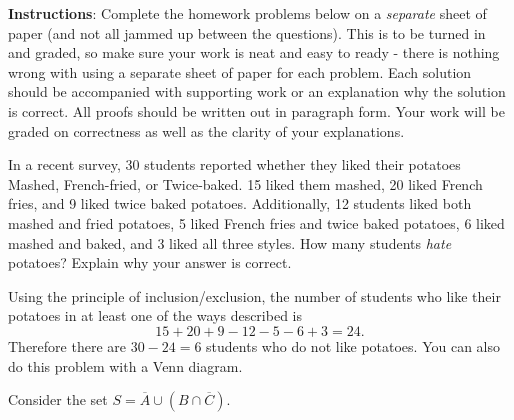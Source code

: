 \documentclass[11pt]{exam}
\def\circleA{(-.5,0) circle (1)}
\def\circleAlabel{(-1.5,.6) node[above]{$A$}}
\def\circleB{(.5,0) circle (1)}
\def\circleBlabel{(1.5,.6) node[above]{$B$}}
\def\circleC{(0,-1) circle (1)}
\def\circleClabel{(.5,-2) node[right]{$C$}}
\def\threesetbox{(-2,-2.5) rectangle (2,1.5)}
\def\bar{\overline}
\begin{document}
\noindent \textbf{Instructions}: Complete the homework problems below on a {\em separate} sheet of paper (and not all jammed up between the questions).  This is to be turned in and graded, so make sure your work is neat and easy to ready - there is nothing wrong with using a separate sheet of paper for each problem. Each solution should be accompanied with supporting work or an explanation why the solution is correct. All proofs should be written out in paragraph form.  Your work will be graded on correctness as well as the clarity of your explanations. 



\begin{questions}
\question[4] In a recent survey, 30 students reported whether they liked their potatoes Mashed, French-fried, or Twice-baked. 15 liked them mashed, 20 liked French fries, and 9 liked twice baked potatoes. Additionally, 12 students liked both mashed and fried potatoes, 5 liked French fries and twice baked potatoes, 6 liked mashed and baked, and 3 liked all three styles. How many students
{\em hate} potatoes?  Explain why your answer is correct.

\begin{solution}
  Using the principle of inclusion/exclusion, the number of students who like their potatoes in at least one of the ways described is \[15 + 20 + 9 - 12 - 5 - 6 + 3 = 24.\]  Therefore there are $30-24 = 6$ students who do not like potatoes.  You can also do this problem with a Venn diagram.
\end{solution}

\question[6] Consider the set $S = \bar A \cup (B \cap \bar C)$.
\end{questions}
\end{document}
